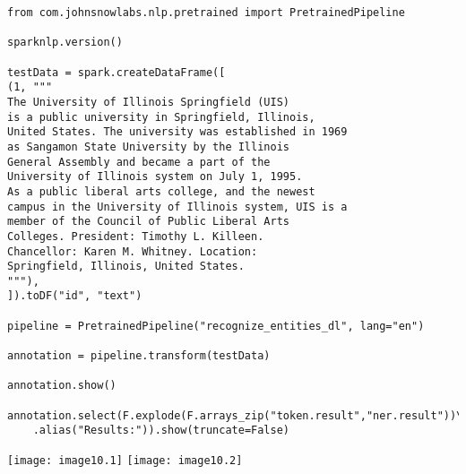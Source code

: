 \documentclass[]{article}
\begin{document}
\begin{verbatim}
from com.johnsnowlabs.nlp.pretrained import PretrainedPipeline

sparknlp.version()

testData = spark.createDataFrame([
(1, """
The University of Illinois Springfield (UIS) 
is a public university in Springfield, Illinois, 
United States. The university was established in 1969 
as Sangamon State University by the Illinois 
General Assembly and became a part of the 
University of Illinois system on July 1, 1995. 
As a public liberal arts college, and the newest 
campus in the University of Illinois system, UIS is a 
member of the Council of Public Liberal Arts 
Colleges. President: Timothy L. Killeen.
Chancellor: Karen M. Whitney. Location: 
Springfield, Illinois, United States.
"""),
]).toDF("id", "text")

pipeline = PretrainedPipeline("recognize_entities_dl", lang="en")

annotation = pipeline.transform(testData)

annotation.show()

annotation.select(F.explode(F.arrays_zip("token.result","ner.result"))\
	.alias("Results:")).show(truncate=False)
\end{verbatim}
\texttt{[image: image10.1]} %
\texttt{[image: image10.2]} %
\end{document}
